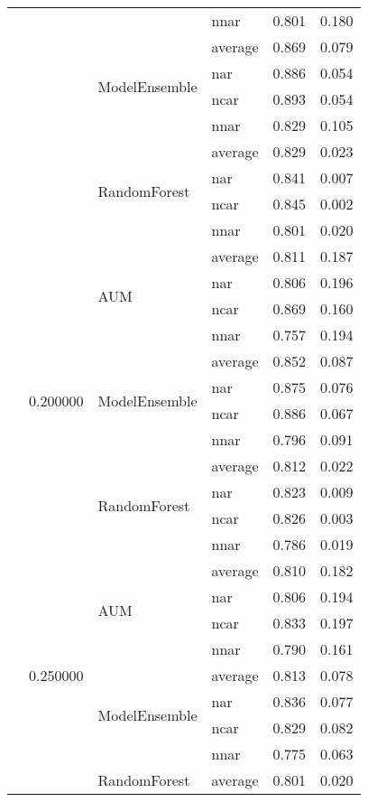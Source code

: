 \begin{longtable}{llllrr}
 &  &  & nnar & 0.801 & 0.180 \\
\cline{3-6}
 &  & \multirow[t]{4}{*}{ModelEnsemble} & average & 0.869 & 0.079 \\
 &  &  & nar & 0.886 & 0.054 \\
 &  &  & ncar & 0.893 & 0.054 \\
 &  &  & nnar & 0.829 & 0.105 \\
\cline{3-6}
 &  & \multirow[t]{4}{*}{RandomForest} & average & 0.829 & 0.023 \\
 &  &  & nar & 0.841 & 0.007 \\
 &  &  & ncar & 0.845 & 0.002 \\
 &  &  & nnar & 0.801 & 0.020 \\
\cline{2-6} \cline{3-6}
 & \multirow[t]{12}{*}{0.200000} & \multirow[t]{4}{*}{AUM} & average & 0.811 & 0.187 \\
 &  &  & nar & 0.806 & 0.196 \\
 &  &  & ncar & 0.869 & 0.160 \\
 &  &  & nnar & 0.757 & 0.194 \\
\cline{3-6}
 &  & \multirow[t]{4}{*}{ModelEnsemble} & average & 0.852 & 0.087 \\
 &  &  & nar & 0.875 & 0.076 \\
 &  &  & ncar & 0.886 & 0.067 \\
 &  &  & nnar & 0.796 & 0.091 \\
\cline{3-6}
 &  & \multirow[t]{4}{*}{RandomForest} & average & 0.812 & 0.022 \\
 &  &  & nar & 0.823 & 0.009 \\
 &  &  & ncar & 0.826 & 0.003 \\
 &  &  & nnar & 0.786 & 0.019 \\
\cline{2-6} \cline{3-6}
 & \multirow[t]{12}{*}{0.250000} & \multirow[t]{4}{*}{AUM} & average & 0.810 & 0.182 \\
 &  &  & nar & 0.806 & 0.194 \\
 &  &  & ncar & 0.833 & 0.197 \\
 &  &  & nnar & 0.790 & 0.161 \\
\cline{3-6}
 &  & \multirow[t]{4}{*}{ModelEnsemble} & average & 0.813 & 0.078 \\
 &  &  & nar & 0.836 & 0.077 \\
 &  &  & ncar & 0.829 & 0.082 \\
 &  &  & nnar & 0.775 & 0.063 \\
\cline{3-6}
 &  & \multirow[t]{4}{*}{RandomForest} & average & 0.801 & 0.020 \\

\end{longtable}
